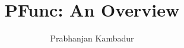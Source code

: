 \documentclass[11pt]{article}
\title{PFunc: An Overview}
\author{Prabhanjan Kambadur}
\begin{document}
\maketitle

\tableofcontents

\pagebreak



\pagebreak



\pagebreak



\pagebreak



\pagebreak



\pagebreak



\pagebreak



\pagebreak



\pagebreak



\pagebreak



\pagebreak



\pagebreak



\pagebreak



\pagebreak



\pagebreak


\end{document}
